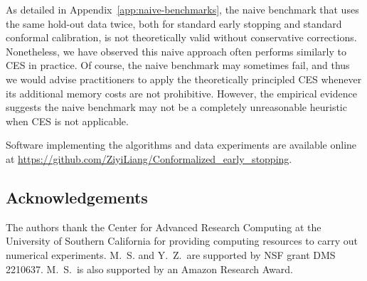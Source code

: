 As detailed in Appendix~\ref{app:naive-benchmarks}, the naive benchmark that uses the same hold-out data twice, both for standard early stopping and standard conformal calibration, is not theoretically valid without conservative corrections. Nonetheless, we have observed this naive approach often performs similarly to CES in practice.
Of course, the naive benchmark may sometimes fail, and thus we would advise practitioners to apply the theoretically principled CES whenever its additional memory costs are not prohibitive. However, the empirical evidence suggests the naive benchmark may not be a completely unreasonable heuristic when CES is not applicable.


Software implementing the algorithms and data experiments are available online at \url{https://github.com/ZiyiLiang/Conformalized_early_stopping}.


\subsection*{Acknowledgements}
The authors thank the Center for Advanced Research Computing at the University of Southern California for providing computing resources to carry out numerical experiments.
M.~S. and Y.~Z.~are supported by NSF grant DMS 2210637.
M.~S.~is also supported by an Amazon Research Award. 


